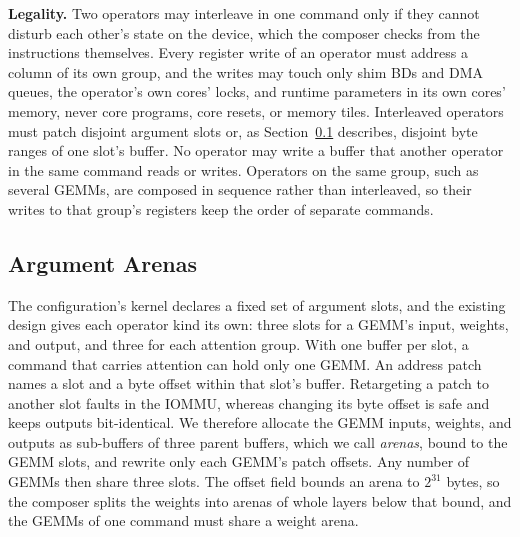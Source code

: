 \textbf{Legality.}
Two operators may interleave in one command only if they cannot disturb each other's state on the device, which the composer checks from the instructions themselves.
Every register write of an operator must address a column of its own group, and the writes may touch only shim BDs and DMA queues, the operator's own cores' locks, and runtime parameters in its own cores' memory, never core programs, core resets, or memory tiles.
Interleaved operators must patch disjoint argument slots or, as Section~\ref{subsec:arenas} describes, disjoint byte ranges of one slot's buffer.
No operator may write a buffer that another operator in the same command reads or writes.
Operators on the same group, such as several GEMMs, are composed in sequence rather than interleaved, so their writes to that group's registers keep the order of separate commands.

\subsection{Argument Arenas}
\label{subsec:arenas}

The configuration's kernel declares a fixed set of argument slots, and the existing design gives each operator kind its own: three slots for a GEMM's input, weights, and output, and three for each attention group.
With one buffer per slot, a command that carries attention can hold only one GEMM.
An address patch names a slot and a byte offset within that slot's buffer.
Retargeting a patch to another slot faults in the IOMMU, whereas changing its byte offset is safe and keeps outputs bit-identical.
We therefore allocate the GEMM inputs, weights, and outputs as sub-buffers of three parent buffers, which we call \emph{arenas}, bound to the GEMM slots, and rewrite only each GEMM's patch offsets.
Any number of GEMMs then share three slots.
The offset field bounds an arena to $2^{31}$ bytes, so the composer splits the weights into arenas of whole layers below that bound, and the GEMMs of one command must share a weight arena.


